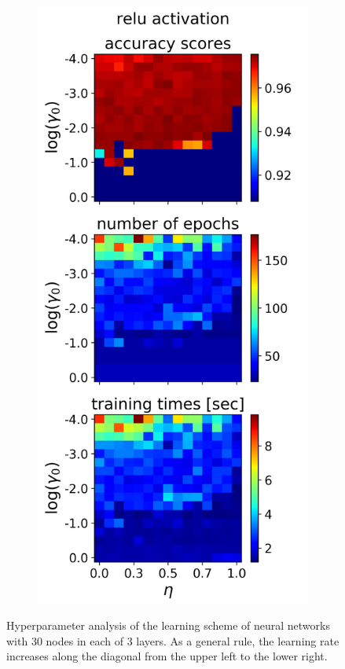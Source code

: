 \documentclass[nofootinbib,reprint,english]{revtex4-1}
\begin{document}
\begin{figure}[h!]
\begin{subfigure}{0.32\textwidth}
	\end{subfigure}
	~
	\begin{subfigure}{0.32\textwidth}
	\centering
	\includegraphics[scale=0.38]{../results/NN/img/gridsearch2_relu3.png}
	\end{subfigure}	
\caption{Hyperparameter analysis of the learning scheme of neural networks with 30 nodes in each of 3 layers. As a general rule, the learning rate increases along the diagonal from the upper left to the lower right.}
\label{fig:NNgridsearch2_3}
\end{figure}
\clearpage
\twocolumngrid
\end{document}

